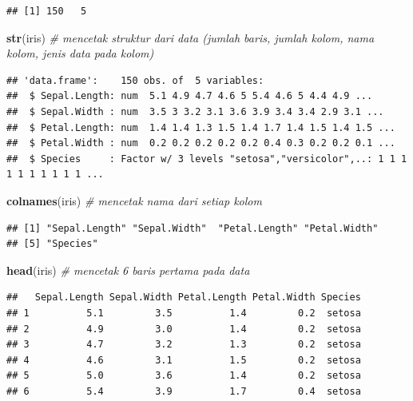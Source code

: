 \documentclass[]{article}
\newenvironment{Shaded}{\begin{snugshade}}{\end{snugshade}}
\newcommand{\CommentTok}[1]{\textcolor[rgb]{0.56,0.35,0.01}{\textit{#1}}}
\newcommand{\KeywordTok}[1]{\textcolor[rgb]{0.13,0.29,0.53}{\textbf{#1}}}
\newcommand{\NormalTok}[1]{#1}
\begin{document}
\begin{verbatim}
## [1] 150   5
\end{verbatim}

\begin{Shaded}
\begin{Highlighting}[]
\KeywordTok{str}\NormalTok{(iris) }\CommentTok{# mencetak struktur dari data (jumlah baris, jumlah kolom, nama kolom, jenis data pada kolom)}
\end{Highlighting}
\end{Shaded}

\begin{verbatim}
## 'data.frame':    150 obs. of  5 variables:
##  $ Sepal.Length: num  5.1 4.9 4.7 4.6 5 5.4 4.6 5 4.4 4.9 ...
##  $ Sepal.Width : num  3.5 3 3.2 3.1 3.6 3.9 3.4 3.4 2.9 3.1 ...
##  $ Petal.Length: num  1.4 1.4 1.3 1.5 1.4 1.7 1.4 1.5 1.4 1.5 ...
##  $ Petal.Width : num  0.2 0.2 0.2 0.2 0.2 0.4 0.3 0.2 0.2 0.1 ...
##  $ Species     : Factor w/ 3 levels "setosa","versicolor",..: 1 1 1 1 1 1 1 1 1 1 ...
\end{verbatim}

\begin{Shaded}
\begin{Highlighting}[]
\KeywordTok{colnames}\NormalTok{(iris) }\CommentTok{# mencetak nama dari setiap kolom}
\end{Highlighting}
\end{Shaded}

\begin{verbatim}
## [1] "Sepal.Length" "Sepal.Width"  "Petal.Length" "Petal.Width" 
## [5] "Species"
\end{verbatim}

\begin{Shaded}
\begin{Highlighting}[]
\KeywordTok{head}\NormalTok{(iris) }\CommentTok{# mencetak 6 baris pertama pada data}
\end{Highlighting}
\end{Shaded}

\begin{verbatim}
##   Sepal.Length Sepal.Width Petal.Length Petal.Width Species
## 1          5.1         3.5          1.4         0.2  setosa
## 2          4.9         3.0          1.4         0.2  setosa
## 3          4.7         3.2          1.3         0.2  setosa
## 4          4.6         3.1          1.5         0.2  setosa
## 5          5.0         3.6          1.4         0.2  setosa
## 6          5.4         3.9          1.7         0.4  setosa
\end{verbatim}
\end{document}
